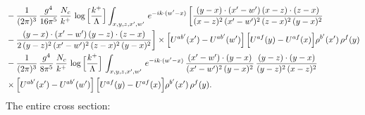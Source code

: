 \documentclass[9pt]{article}
\numberwithin{equation}{section}
\begin{document}
\begin{align}
&-\frac{1}{(2\pi)^{3}}\,\frac{g^{4}}{16\pi^{5}}\,\frac{N_{c}}{k^{+}}\,\log\Big[\frac{k^{+}}{\Lambda}\Big]\int_{x,y,z,x',w'}\,e^{-ik\cdot(w'-x)}\,\bigg[\frac{(y-x)\cdot (x'-w')\,(x-z)\cdot (z-x)}{(x-z)^{2}\,(x'-w')^{2}\,(z-x)^{2}\,(y-x)^{2}}\notag \\ & -\frac{(y-x)\cdot (x'-w')\,(y-z)\cdot (z-x)}{2\,(y-z)^{2}\,(x'-w')^{2}\,(z-x)^{2}\,(y-x)^{2}}\bigg]\times\Big[U^{ab'}(x')-U^{ab'}(w')\Big]\,\Big[U^{af}(y)-U^{af}(x)\Big]\rho^{b'}(x')\,\rho^{f}(y)\notag\\
&-\frac{1}{(2\pi)^{3}}\,\frac{g^{4}}{8\pi^{5}}\,\frac{N_{c}}{k^{+}}\,\log\Big[\frac{k^{+}}{\Lambda}\Big]\,\int_{x,y,z,x',w'}\,e^{-ik\cdot(w'-x)}\,\frac{(x'-w')\cdot(y-x)}{(x'-w')^{2}\,(y-x)^{2}}\,\frac{(y-z)\cdot(y-x)}{(y-z)^{2}\,(x-z)^{2}}\notag\\
&\times\Big[U^{ab'}(x')-U^{ab'}(w')\Big]\,\Big[U^{af}(y)-U^{af}(x)\Big]\rho^{b'}(x')\,\rho^{f}(y).
\end{align}
The entire cross section: 
\end{document}
